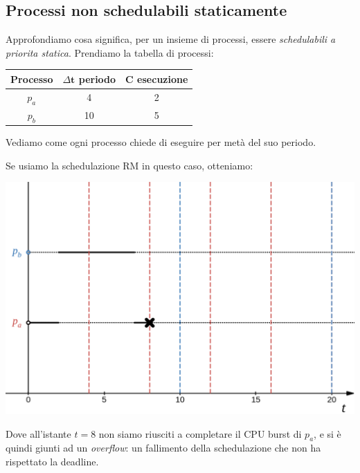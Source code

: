 \documentclass[a4paper,11pt]{article}
\begin{document}
\subsection{Processi non schedulabili staticamente}
Approfondiamo cosa significa, per un insieme di processi, essere \textit{schedulabili a priorita statica}.
Prendiamo la tabella di processi: 
\begin{table}[H]
	\center {}
	\begin{tabular} { c || c | c }
		\bfseries Processo & \bfseries $\Delta \mathbf{t}$ periodo & \bfseries $\mathbf{C}$ esecuzione \\
		\hline
		$p_a$ & 4 & 2 \\ 
		$p_b$ & 10 & 5
	\end{tabular}
\end{table}

Vediamo come ogni processo chiede di eseguire per metà del suo periodo.

Se usiamo la schedulazione RM in questo caso, otteniamo:
\begin{center}
	\includegraphics[scale=0.3]{../figures/rm_fail.png}
\end{center}

Dove all'istante $t = 8$ non siamo riusciti a completare il CPU burst di $p_a$, e si è quindi giunti ad un \textit{overflow}: un fallimento della schedulazione che non ha rispettato la deadline.

\newpage
\end{document}
